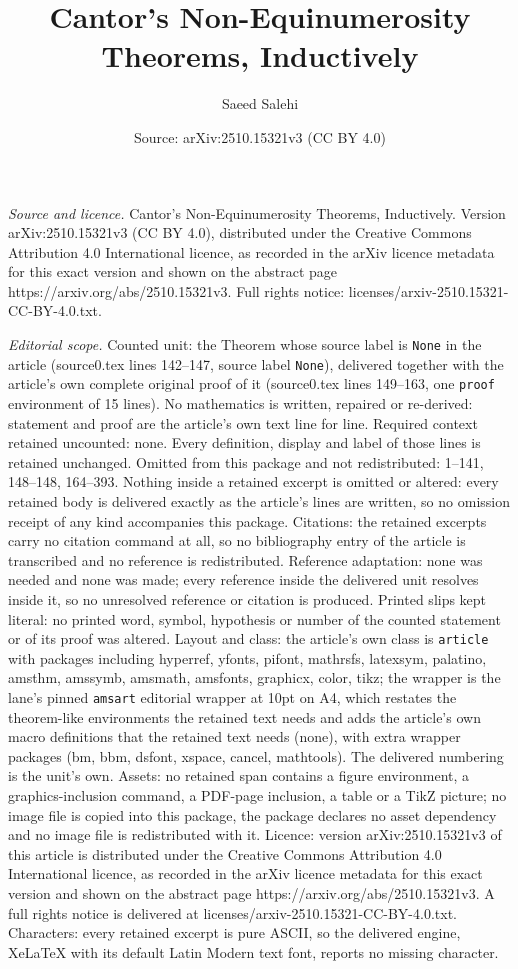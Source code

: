 \documentclass[10pt,a4paper]{amsart}
\title[Cantor's Non-Equinumerosity Theorems, Inductively]{Cantor's Non-Equinumerosity Theorems, Inductively}
\author{Saeed Salehi}
\date{Source: arXiv:2510.15321v3 (CC BY 4.0)}
\begin{document}
\maketitle

\noindent\emph{Source and licence.} Cantor's Non-Equinumerosity Theorems, Inductively. Version arXiv:2510.15321v3 (CC BY 4.0), distributed under the Creative Commons Attribution 4.0 International licence, as recorded in the arXiv licence metadata for this exact version and shown on the abstract page https://arxiv.org/abs/2510.15321v3. Full rights notice: licenses/arxiv-2510.15321-CC-BY-4.0.txt.\par\smallskip

\noindent\textit{Editorial scope.} Counted unit: the Theorem whose source label is \texttt{None} in the article (source0.tex lines 142--147, source label \texttt{None}), delivered together with the article's own complete original proof of it (source0.tex lines 149--163, one \texttt{proof} environment of 15 lines). No mathematics is written, repaired or re-derived: statement and proof are the article's own text line for line. Required context retained uncounted: none. Every definition, display and label of those lines is retained unchanged. Omitted from this package and not redistributed: 1--141, 148--148, 164--393. Nothing inside a retained excerpt is omitted or altered: every retained body is delivered exactly as the article's lines are written, so no omission receipt of any kind accompanies this package. Citations: the retained excerpts carry no citation command at all, so no bibliography entry of the article is transcribed and no reference is redistributed. Reference adaptation: none was needed and none was made; every reference inside the delivered unit resolves inside it, so no unresolved reference or citation is produced. Printed slips kept literal: no printed word, symbol, hypothesis or number of the counted statement or of its proof was altered. Layout and class: the article's own class is \texttt{article} with packages including hyperref, yfonts, pifont, mathrsfs, latexsym, palatino, amsthm, amssymb, amsmath, amsfonts, graphicx, color, tikz; the wrapper is the lane's pinned \texttt{amsart} editorial wrapper at 10pt on A4, which restates the theorem-like environments the retained text needs and adds the article's own macro definitions that the retained text needs (none), with extra wrapper packages (bm, bbm, dsfont, xspace, cancel, mathtools). The delivered numbering is the unit's own. Assets: no retained span contains a figure environment, a graphics-inclusion command, a PDF-page inclusion, a table or a TikZ picture; no image file is copied into this package, the package declares no asset dependency and no image file is redistributed with it. Licence: version arXiv:2510.15321v3 of this article is distributed under the Creative Commons Attribution 4.0 International licence, as recorded in the arXiv licence metadata for this exact version and shown on the abstract page https://arxiv.org/abs/2510.15321v3. A full rights notice is delivered at licenses/arxiv-2510.15321-CC-BY-4.0.txt. Characters: every retained excerpt is pure ASCII, so the delivered engine, XeLaTeX with its default Latin Modern text font, reports no missing character.
\end{document}
